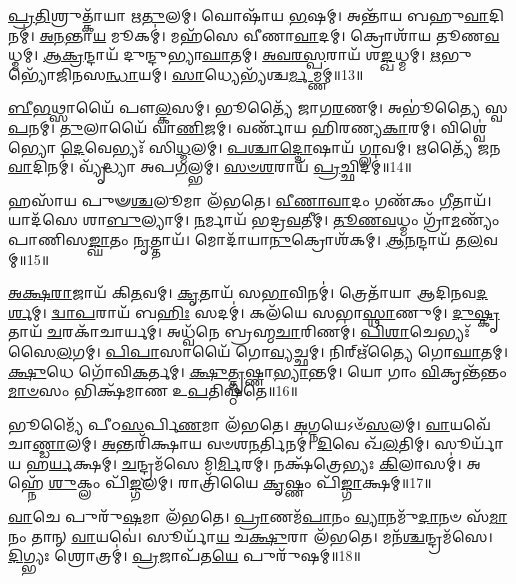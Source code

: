 \-\ul{𑌪𑍍𑌰}\-\-\ul{𑌤𑌿}\-𑌶𑍍𑌰𑍁𑌤𑍍𑌕𑌾᳴𑌯𑌾 𑌋\-\ul{𑌤𑍁}\-𑌲𑌮𑍍।
𑌘𑍋𑌷𑌾᳴𑌯 \ul{𑌭}\-𑌷𑌮𑍍।
𑌅𑌨𑍍𑌤𑌾᳴𑌯 𑌬𑌹𑍁\-\ul{𑌵𑌾}\-𑌦𑌿𑌨𑌮𑍍॑।
\-\ul{𑌅}\-\-\ul{𑌨}\-𑌨𑍍𑌤𑌾\-\ul{𑌯} 𑌮𑍂𑌕𑌮𑍍॑।
𑌮𑌹᳴𑌸𑍇 𑌵𑍀𑌣𑌾\-\ul{𑌵𑌾}\-𑌦𑌮𑍍।
𑌕𑍍𑌰𑍋𑌶𑌾᳴𑌯 𑌤𑍂𑌣\-\ul{𑌵}\-𑌧𑍍𑌮𑌮𑍍।
\-\ul{𑌆}\-\-\ul{𑌕𑍍𑌰}\-𑌨𑍍𑌦𑌾𑌯᳴ 𑌦𑍁𑌨𑍍𑌦𑍁𑌭𑍍𑌯𑌾\-\ul{𑌘𑌾}\-𑌤𑌮𑍍।
\-\ul{𑌅}\-\-\ul{𑌵}\-\-\ul{𑌰}\-\-\ul{𑌸𑍍𑌪}\-𑌰𑌾𑌯᳴ 𑌶\-\ul{𑌙𑍍𑌖}\-𑌧𑍍𑌮𑌮𑍍।
\-\ul{𑌋}\-𑌭𑍁𑌭𑍍𑌯𑍋᳴𑌜𑌿𑌨𑌸\-\ul{𑌨𑍍𑌧𑌾}\-𑌯𑌮𑍍।
\-\ul{𑌸𑌾}\-𑌧𑍍𑌯𑍇𑌭𑍍𑌯᳴𑌶𑍍𑌚\-\ul{𑌰𑍍𑌮}\-𑌮𑍍𑌣𑌮𑍍॥13॥

\-\ul{𑌬𑍀}\-\-\ul{𑌭}\-𑌥𑍍𑌸𑌾𑌯𑍈᳴ 𑌪𑍗\-\ul{𑌲𑍍𑌕}\-𑌸𑌮𑍍।
𑌭𑍂𑌤𑍍𑌯𑍈᳴ 𑌜𑌾𑌗\-\ul{𑌰}\-𑌣𑌮𑍍।
𑌅𑌭𑍂॑𑌤𑍍𑌯𑍈 𑌸𑍍𑌵\-\ul{𑌪}\-𑌨𑌮𑍍।
\-\ul{𑌤𑍁}\-𑌲𑌾𑌯𑍈᳴ 𑌵𑌾\-\ul{𑌣𑌿}\-𑌜𑌮𑍍।
𑌵𑌰𑍍𑌣𑌾᳴𑌯 𑌹𑌿𑌰𑌣𑍍𑌯\-\ul{𑌕𑌾}\-𑌰𑌮𑍍।
𑌵𑌿𑌶𑍍𑌵𑍇॑𑌭𑍍𑌯𑍋 \ul{𑌦𑍇}\-𑌵𑍇𑌭𑍍𑌯𑌃᳴ 𑌸𑌿\-\ul{𑌧𑍍𑌮}\-𑌲𑌮𑍍।
\-\ul{𑌪}\-\-\ul{𑌶𑍍𑌚𑌾}\-\-\ul{𑌦𑍍𑌦𑍋}\-𑌷𑌾𑌯᳴ \ul{𑌗𑍍𑌲𑌾}\-𑌵𑌮𑍍।
𑌋𑌤𑍍𑌯𑍈᳴ 𑌜𑌨\-\ul{𑌵𑌾}\-𑌦𑌿𑌨𑌮𑍍॑।
𑌵𑍍𑌯𑍃᳴𑌦𑍍𑌧𑍍𑌯𑌾 𑌅𑌪\-\ul{𑌗}\-𑌲𑍍𑌭𑌮𑍍।
\-\ul{𑌸}\-\-\ul{𑍞}\-\-\ul{𑌶}\-𑌰𑌾𑌯᳴ \ul{𑌪𑍍𑌰}\-𑌚𑍍𑌛𑌿𑌦𑌮𑍍॑॥14॥

𑌹𑌸𑌾᳴𑌯 𑌪𑍁𑍟\-\ul{𑌶𑍍𑌚}\-𑌲𑍂𑌮𑌾 𑌲᳴𑌭𑌤𑍇।
\-\ul{𑌵𑍀}\-\-\ul{𑌣𑌾}\-\-\ul{𑌵𑌾}\-𑌦𑌂 𑌗𑌣᳴𑌕𑌂 \ul{𑌗𑍀}\-𑌤𑌾𑌯᳴।
𑌯𑌾𑌦᳴𑌸𑍇 𑌶𑌾\-\ul{𑌬𑍁}\-𑌲𑍍𑌯𑌾𑌮𑍍।
\-\ul{𑌨}\-𑌰𑍍𑌮𑌾𑌯᳴ 𑌭𑌦𑍍𑌰\-\ul{𑌵}\-𑌤𑍀𑌮𑍍।
\-\ul{𑌤𑍂}\-\-\ul{𑌣}\-\-\ul{𑌵}\-𑌧𑍍𑌮𑌂 𑌗𑍍𑌰𑌾᳴\-\ul{𑌮}\-𑌣𑍍𑌯𑌂᳴ 𑌪𑌾𑌣𑌿𑌸\-\ul{𑌙𑍍𑌘𑌾}\-𑌤𑌂 \ul{𑌨𑍃}\-𑌤𑍍𑌤𑌾𑌯᳴।
𑌮𑍋𑌦𑌾᳴𑌯𑌾\-\ul{𑌨𑍁}\-𑌕𑍍𑌰𑍋𑌶᳴𑌕𑌮𑍍।
\-\ul{𑌆}\-\-\ul{𑌨}\-𑌨𑍍𑌦𑌾𑌯᳴ 𑌤\-\ul{𑌲}\-𑌵𑌮𑍍॥15॥

\-\ul{𑌅}\-\-\ul{𑌕𑍍𑌷}\-\-\ul{𑌰𑌾}\-𑌜𑌾𑌯᳴ 𑌕𑌿\-\ul{𑌤}\-𑌵𑌮𑍍।
\-\ul{𑌕𑍃}\-𑌤𑌾𑌯᳴ 𑌸\-\ul{𑌭𑌾}\-𑌵𑌿𑌨𑌮𑍍॑।
𑌤𑍍𑌰𑍇𑌤𑌾᳴𑌯𑌾 𑌆𑌦𑌿𑌨𑌵\-\ul{𑌦}\-\-\ul{𑌰𑍍}\-𑌶𑌮𑍍।
\-\ul{𑌦𑍍𑌵𑌾}\-\-\ul{𑌪}\-𑌰𑌾𑌯᳴ 𑌬\-\ul{𑌹𑌿𑌃} 𑌸𑌦𑌮𑍍॑।
𑌕𑌲᳴𑌯𑍇 𑌸𑌭𑌾\-\ul{𑌸𑍍𑌥𑌾}\-𑌣𑍁𑌮𑍍।
\-\ul{𑌦𑍁}\-\-\ul{𑌷𑍍𑌕𑍃}\-𑌤𑌾𑌯᳴ \ul{𑌚}\-𑌰𑌕𑌾᳴𑌚𑌾𑌰𑍍𑌯𑌮𑍍।
𑌅𑌧𑍍𑌵᳴𑌨𑍇 𑌬𑍍𑌰𑌹𑍍𑌮\-\ul{𑌚𑌾}\-𑌰𑌿𑌣𑌮𑍍॑।
\-\ul{𑌪𑌿}\-\-\ul{𑌶𑌾}\-𑌚𑍇𑌭𑍍𑌯𑌃᳴ 𑌸𑍈\-\ul{𑌲}\-𑌗𑌮𑍍।
\-\ul{𑌪𑌿}\-\-\ul{𑌪𑌾}\-𑌸𑌾𑌯𑍈᳴ 𑌗𑍋\-\ul{𑌵𑍍𑌯}\-𑌚𑍍𑌛𑌮𑍍।
𑌨𑌿𑌰𑍍\mbox{}𑌋᳴𑌤𑍍𑌯𑍈 𑌗𑍋\-\ul{𑌘𑌾}\-𑌤𑌮𑍍।
\-\ul{𑌕𑍍𑌷𑍁}\-𑌧𑍇 𑌗𑍋᳴𑌵𑌿\-\ul{𑌕}\-𑌰𑍍𑌤𑌮𑍍।
\-\ul{𑌕𑍍𑌷𑍁}\-\-\ul{𑌤𑍍𑌤𑍃}\-𑌷𑍍𑌣𑌾\-\ul{𑌭𑍍𑌯𑌾}\-𑌨𑍍𑌤𑌮𑍍।
𑌯𑍋 𑌗𑌾𑌂 \ul{𑌵𑌿}\-𑌕𑍃𑌨𑍍𑌤᳴𑌨𑍍𑌤𑌂 \ul{𑌮𑌾}\-\-\ul{𑍞}\-𑌸𑌂 𑌭𑌿𑌕𑍍𑌷᳴𑌮𑌾𑌣 𑌉\-\ul{𑌪}\-𑌤𑌿𑌷𑍍𑌠᳴𑌤𑍇॥16॥

𑌭𑍂𑌮𑍍𑌯𑍈᳴ 𑌪𑍀𑌠\-\ul{𑌸}\-𑌰𑍍𑌪𑌿\-\ul{𑌣}\-𑌮𑌾 𑌲᳴𑌭𑌤𑍇।
\-\ul{𑌅}\-𑌗𑍍𑌨𑌯𑍇\-𑌽𑍞᳴\-\ul{𑌸}\-𑌲𑌮𑍍।
\-\ul{𑌵𑌾}\-𑌯𑌵𑍇᳴ 𑌚𑌾\-\ul{𑌣𑍍𑌡𑌾}\-𑌲𑌮𑍍।
\-\ul{𑌅}\-𑌨𑍍𑌤𑌰𑌿᳴𑌕𑍍𑌷𑌾𑌯 𑌵𑍞𑌶\-\ul{𑌨}\-𑌰𑍍𑌤𑌿𑌨𑌮𑍍॑।
\-\ul{𑌦𑌿}\-𑌵𑍇 𑌖᳴\-\ul{𑌲}\-𑌤𑌿𑌮𑍍।
𑌸𑍂𑌰𑍍𑌯𑌾᳴𑌯 𑌹\-\ul{𑌰𑍍𑌯}\-𑌕𑍍𑌷𑌮𑍍।
\-\ul{𑌚}\-𑌨𑍍𑌦𑍍𑌰𑌮᳴𑌸𑍇 𑌮𑌿\-\ul{𑌰𑍍𑌮𑌿}\-𑌰𑌮𑍍।
𑌨𑌕𑍍𑌷᳴𑌤𑍍𑌰𑍇𑌭𑍍𑌯𑌃 \ul{𑌕𑌿}\-𑌲𑌾𑌸𑌮𑍍॑।
𑌅𑌹𑍍𑌨𑍇᳴ \ul{𑌶𑍁}\-𑌕𑍍𑌲𑌂 𑌪𑌿᳴\-\ul{𑌙𑍍𑌗}\-𑌲𑌮𑍍।
𑌰𑌾𑌤𑍍𑌰𑌿᳴𑌯𑍈 \ul{𑌕𑍃}\-𑌷𑍍𑌣𑌂 𑌪𑌿᳴\-\ul{𑌙𑍍𑌗𑌾}\-𑌕𑍍𑌷𑌮𑍍॥17॥

\-\ul{𑌵𑌾}\-𑌚𑍇 𑌪𑍁𑌰𑍁᳴\-\ul{𑌷}\-𑌮𑌾 𑌲᳴𑌭𑌤𑍇।
\-\ul{𑌪𑍍𑌰𑌾}\-𑌣𑌮᳴\-\ul{𑌪𑌾}\-𑌨𑌂 \ul{𑌵𑍍𑌯𑌾}\-𑌨𑌮𑍁᳴\-\ul{𑌦𑌾}\-𑌨𑍞 𑌸᳴\-\ul{𑌮𑌾}\-𑌨𑌂 𑌤𑌾𑌨𑍍 \ul{𑌵𑌾}\-𑌯𑌵𑍇॑।
𑌸𑍂𑌰𑍍𑌯𑌾᳴\-\ul{𑌯} 𑌚\-\ul{𑌕𑍍𑌷𑍁}\-𑌰𑌾 𑌲᳴𑌭𑌤𑍇।
𑌮𑌨᳴\-\ul{𑌶𑍍𑌚}\-𑌨𑍍𑌦𑍍𑌰𑌮᳴𑌸𑍇।
\-\ul{𑌦𑌿}\-𑌗𑍍𑌭𑍍𑌯𑌃 𑌶𑍍𑌰𑍋𑌤𑍍𑌰𑌮𑍍॑।
\-\ul{𑌪𑍍𑌰}\-𑌜𑌾𑌪᳴𑌤\-\ul{𑌯𑍇} 𑌪𑍁𑌰𑍁᳴𑌷𑌮𑍍॥18॥

